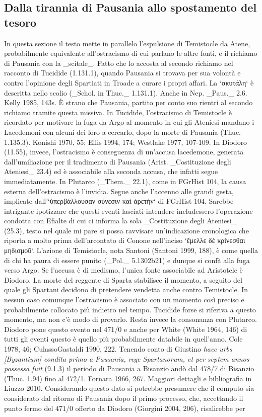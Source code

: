           \subsection*{Dalla tirannia di Pausania allo spostamento del tesoro}
            In questa sezione il testo mette in parallelo l'espulsione di Temistocle da Atene, probabilmente equivalente all'ostracismo di cui parlano le altre fonti, e il richiamo di Pausania  con la _scitale_. Fatto che lo accosta al secondo richiamo nel racconto di Tucidide (1.131.1), quando Pausania  si trovava per sua volontà e contro l'opinione degli Spartiati in Troade a curare i propri affari. La `σκυτάλη` è descritta nello scolio (_Schol. in Thuc._ 1.131.1). Anche in Nep. _Paus._ 2.6. Kelly 1985, 143s. È strano che Pausania, partito per conto suo  rientri al secondo richiamo tramite questa missiva.
            In Tucidide, l'ostracismo di Temistocle è ricordato per motivare la fuga da Argo al momento in cui gli Ateniesi mandano i Lacedemoni con alcuni dei loro a cercarlo, dopo la morte di Pausania  (Thuc. 1.135.3). Konishi 1970, 55; Ellis 1994, 174; Westlake 1977, 107-109. In  Diodoro (11.55), invece, l'ostracismo è conseguenza di un'accusa lacedemone, generata dall'umiliazione per il tradimento di Pausania  (Arist. _Costituzione degli Ateniesi_ 23.4) ed è associabile alla seconda accusa, che infatti segue immediatamente. In Plutarco (_Them._   22.1), come in FGrHist 104, la causa esterna  dell'ostracismo è l'invidia. Segue anche l'accenno alle grandi gesta, implicate dall'`ὑπερβάλλουσαν σύνεσιν καὶ ἀρετὴν` di FGrHist 104. Sarebbe intrigante ipotizzare che questi eventi lasciati intendere includessero l'operazione condotta con Efialte di cui ci informa la sola _Costituzione degli Ateniesi_ (25.3), testo nel quale mi pare si possa ravvisare un'indicazione cronologica che riporta a molto prima dell'arcontato di Conone  nell'inciso `ἔμελλε δὲ κρίνεσθαι μηδισμοῦ`. L'azione di Temistocle, nota Santoni (Santoni 1999, 188), è come quella di chi ha paura di essere punito (_Pol._ 5.1302b21) e dunque si confà alla fuga verso Argo. Se l'accusa è di medismo, l'unica fonte associabile ad Aristotele è Diodoro. La morte del reggente di Sparta stabilisce il momento, a seguito del quale gli Spartani decidono di pretendere vendetta anche contro Temistocle. In nessun caso comunque l'ostracismo è associato con un momento così preciso e probabilmente collocato più indietro nel tempo. Tucidide forse si riferiva a questo momento, ma non c'è modo di provarlo. Resta invece la consonanza con Plutarco.  Diodoro pone questo evento nel 471/0 e anche per White (White 1964, 146) di tutti gli eventi questo è quello più probabilmente databile in quell'anno. Cole 1978, 46; CulassoGastaldi 1990, 222. Tenendo conto di Giustino\emph{ haec urbs [Byzantium] condita primo a Pausania, rege Spartanorum, et per septem annos possessa fuit} (9.1.3) il periodo di Pausania  a Bisanzio andò dal 478/7 di Bisanzio (Thuc. 1.94) fino al 472/1. Fornara 1966, 267. Maggiori dettagli e bibliografia in Liuzzo 2010. Considerando questo dato si potrebbe presumere che il computo sia considerato dal ritorno di Pausania  dopo il primo processo, che, accettando il punto fermo del 471/0 offerto da  Diodoro (Giorgini 2004, 206), risalirebbe per 